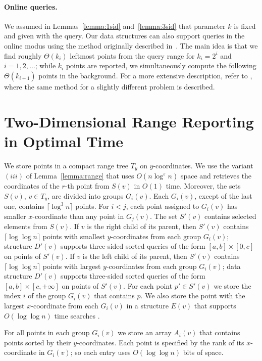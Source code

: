 \documentclass[11pt]{article}
\def\ceil#1{\lceil #1 \rceil}
\newcommand{\no}[1]{}
\newcommand{\eps}{\varepsilon}
\begin{document}
\paragraph{Online queries.}
We assumed in Lemmas~\ref{lemma:1sid} and~\ref{lemma:3sid} that 
parameter $k$ is fixed and given with the query. 
Our data structures can also support queries in the online modus using 
the method originally described in~\cite{BrodalFGL09}. 
The main idea is that we find roughly $\Theta(k_i)$ leftmost points from the 
query range for $k_i=2^i$ and $i=1,2,\ldots$; while $k_i$ points are reported, we simultaneously compute the following $\Theta(k_{i+1})$ points in the background. 
For a more extensive description, refer to \cite[Section 4.1]{NavN12}, where the same method for a slightly different problem is described.   


\section{Two-Dimensional Range Reporting in Optimal Time}
\label{sec:2dim-range}
We store points in a compact range tree $T_y$ on
$y$-coordinates. We use the variant $(iii)$ of Lemma~\ref{lemma:range} that uses 
$O(n\log^{\eps}n)$ space and retrieves the coordinates of the $r$-th point
 from
 $S(v)$ in $O(1)$ time. Moreover, the sets $S(v)$, $v\in T_y$, are divided into
groups $G_i(v)$. Each $G_i(v)$, except of the last one, contains
$\lceil\log^3 n\rceil$ points. For $i<j$, each point assigned to $G_i(v)$ has smaller $x$-coordinate than any point in $G_j(v)$. The set $S'(v)$ contains selected elements from $S(v)$. If $v$ is the right child of its
parent, then $S'(v)$ contains $\ceil{\log\log n}$ points with smallest
$y$-coordinates from each group $G_i(v)$; structure $D'(v)$
supports three-sided sorted queries of the form $[a,b]\times [0,c]$ on
points of $S'(v)$.  If $v$ is the left child of its parent, then
$S'(v)$ contains $\ceil{\log\log n}$ points with largest $y$-coordinates from
each group $G_i(v)$; data structure $D'(v)$ supports three-sided
sorted queries of the form $[a,b]\times [c,+\infty]$ on points of
$S'(v)$.  For each point $p'\in S'(v)$ we store the index $i$ of the
group $G_i(v)$ that contains $p$.  We also store the point with
the largest $x$-coordinate from each $G_i(v)$ in a structure
$E(v)$ that supports $O(\log \log n)$ time searches \cite{BoasKZ77}.

For all points in each group $G_i(v)$ we store an array $A_i(v)$ that
contains  points sorted by their $y$-coordinates.  Each point is
specified by the rank of its $x$-coordinate in $G_i(v)$; so each
entry uses $O(\log \log n)$ bits of space.
\no{
We answer a two-dimensional query by answering two three-sided 
queries in the online modus. Data structures $D'(u)$ are main 
tools for answering relevant three-sided queries. We also use 
the structures for single groups 
}
\end{document}
